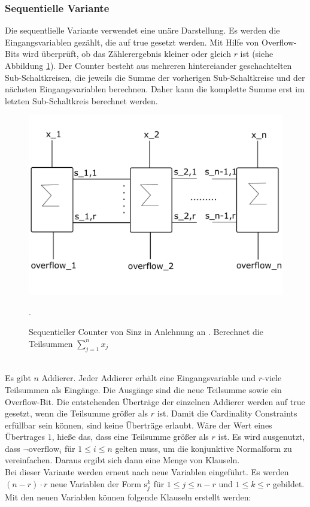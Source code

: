 \documentclass[a4,abstract=on]{scrartcl}
\begin{document}
		\subsubsection{Sequentielle Variante}
Die sequentlielle Variante verwendet eine unäre Darstellung. Es werden die Eingangsvariablen gezählt, die auf true gesetzt werden. Mit Hilfe von Overflow-Bits wird überprüft, ob das Zählerergebnis kleiner oder gleich $r$ ist (siehe Abbildung \ref{fig:sinz_counter}). Der Counter besteht aus mehreren hintereiander geschachtelten Sub-Schaltkreisen, die jeweils die Summe der vorherigen Sub-Schaltkreise und der nächsten Eingangsvariablen berechnen. Daher kann die komplette Summe erst im letzten Sub-Schaltkreis berechnet werden. \\


\begin{figure}[H]
\centering
\includegraphics[width=\textwidth]{sinz_seq.pdf}
\caption{Sequentieller Counter von Sinz in Anlehnung an \cite[][] {sinz}. Berechnet die Teilsummen $\sum_{j=1}^{n}x_j$}.
\label{fig:sinz_counter}
\end{figure}
\ \\
Es gibt $n$ Addierer. Jeder Addierer erhält eine Eingangsvariable und $r$-viele Teilsummen als Eingänge. Die Ausgänge sind die neue Teilsumme sowie ein Overflow-Bit. Die entstehenden Überträge der einzelnen Addierer werden auf true gesetzt, wenn die Teilsumme größer als $r$ ist. Damit die Cardinality Constraints erfüllbar sein können, sind keine Überträge erlaubt. Wäre der Wert eines Übertrages $1$, hieße das, dass eine Teilsumme größer als $r$ ist. Es wird ausgenutzt, dass $\neg \text{overflow}_i$ für $1 \leq i \leq n$ gelten muss, um die konjunktive Normalform zu vereinfachen. Daraus ergibt sich dann eine Menge von Klauseln.\\
Bei dieser Variante werden erneut nach \cite[][]{knuth} neue Variablen eingeführt. Es werden $(n-r)\cdot r$ neue Variablen der Form $\text{s}_j^k$ für $1 \leq j \leq n - r$ und $1 \leq k \leq r$ gebildet. \\
Mit den neuen Variablen können folgende Klauseln erstellt werden:\\
\end{document}
